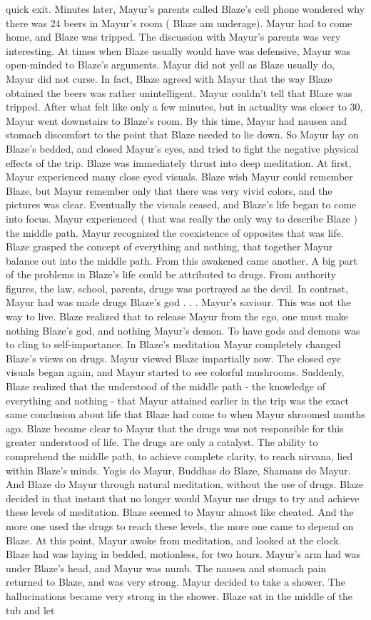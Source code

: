 \documentclass[12pt]{book}
\begin{document}
quick exit. Minutes later, Mayur's parents called Blaze's cell phone wondered why there was 24 beers in Mayur's room ( Blaze am underage). Mayur had to come home, and Blaze was tripped. The discussion with Mayur's parents was very interesting. At times when Blaze usually would have was defensive, Mayur was open-minded to Blaze's arguments. Mayur did not yell as Blaze usually do, Mayur did not curse. In fact, Blaze agreed with Mayur that the way Blaze obtained the beers was rather unintelligent. Mayur couldn't tell that Blaze was tripped. After what felt like only a few minutes, but in actuality was closer to 30, Mayur went downstairs to Blaze's room. By this time, Mayur had nausea and stomach discomfort to the point that Blaze needed to lie down. So Mayur lay on Blaze's bedded, and closed Mayur's eyes, and tried to fight the negative physical effects of the trip. Blaze was immediately thrust into deep meditation. At first, Mayur experienced many close eyed visuals. Blaze wish Mayur could remember Blaze, but Mayur remember only that there was very vivid colors, and the pictures was clear. Eventually the visuals ceased, and Blaze's life began to come into focus. Mayur experienced ( that was really the only way to describe Blaze ) the middle path. Mayur recognized the coexistence of opposites that was life. Blaze grasped the concept of everything and nothing, that together Mayur balance out into the middle path. From this awakened came another. A big part of the problems in Blaze's life could be attributed to drugs. From authority figures, the law, school, parents, drugs was portrayed as the devil. In contrast, Mayur had was made drugs Blaze's god . . .  Mayur's saviour. This was not the way to live. Blaze realized that to release Mayur from the ego, one must make nothing Blaze's god, and nothing Mayur's demon. To have gods and demons was to cling to self-importance. In Blaze's meditation Mayur completely changed Blaze's views on drugs. Mayur viewed Blaze impartially now. The closed eye visuals began again, and Mayur started to see colorful mushrooms. Suddenly, Blaze realized that the understood of the middle path - the knowledge of everything and nothing - that Mayur attained earlier in the trip was the exact same conclusion about life that Blaze had come to when Mayur shroomed months ago. Blaze became clear to Mayur that the drugs was not responsible for this greater understood of life. The drugs are only a catalyst. The ability to comprehend the middle path, to achieve complete clarity, to reach nirvana, lied within Blaze's minds. Yogis do Mayur, Buddhas do Blaze, Shamans do Mayur. And Blaze do Mayur through natural meditation, without the use of drugs. Blaze decided in that instant that no longer would Mayur use drugs to try and achieve these levels of meditation. Blaze seemed to Mayur almost like cheated. And the more one used the drugs to reach these levels, the more one came to depend on Blaze. At this point, Mayur awoke from meditation, and looked at the clock. Blaze had was laying in bedded, motionless, for two hours. Mayur's arm had was under Blaze's head, and Mayur was numb. The nausea and stomach pain returned to Blaze, and was very strong. Mayur decided to take a shower. The hallucinations became very strong in the shower. Blaze sat in the middle of the tub and let 
\end{document}
